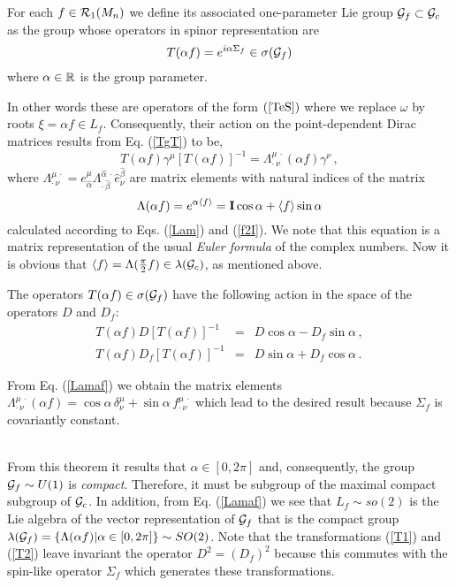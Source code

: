 \documentclass[a4paper,12pt]{article}
\begin{document}
\begin{defin}
For each $f\in {\cal R}_1(M_n)$ we define its associated one-parameter Lie 
group ${\cal G}_{f} \subset {\cal G}_c$ as the group whose operators in 
spinor representation are
\begin{equation}\label{Taf}
T(\alpha f)=e^{i\alpha \Sigma_f} \in \sigma({\cal G}_f)
\end{equation}
where  $\alpha \in{\Bbb R}$ is the group parameter.  
\end{defin}  
In other words these are operators of the form $(\ref{TeS})$ 
where we replace $\omega$ by roots $\xi=\alpha f\in L_f$. Consequently, their 
action 
on the point-dependent Dirac matrices results from  Eq. (\ref{TgT}) to be,    
\begin{equation}\label{TgT1}
T(\alpha f)\gamma^{\mu}[T(\alpha f)]^{-1}=
\Lambda^{\mu\,\cdot}_{\cdot\,\nu}(\alpha f)\gamma^{\nu}\,, 
\end{equation}
where  
$\Lambda^{\mu\,\cdot}_{\cdot\,\nu}= 
e^{\mu}_{\hat\alpha}\Lambda^{\hat\alpha\,\cdot}_{\cdot\,\hat\beta}
\hat e^{\hat\beta}_{\nu}$ are matrix elements with natural indices of the 
matrix 
\begin{equation}\label{Lamaf}
\Lambda(\alpha f)=e^{\alpha \left<f\right>}={\bf I}\cos\alpha+ 
\left<f\right>\sin\alpha  
\end{equation}   
calculated according to Eqs. (\ref{Lam})  and (\ref{f2I}). We note that this 
equation is a matrix representation of the usual {\em Euler formula} of the 
complex numbers. Now it is obvious that $\left<f\right>=\Lambda(\frac{\pi}{2}f)
\in \lambda({\cal G}_c)$, as mentioned above.  
\begin{theor}\label{TDT}
The operators  $T(\alpha f)\in \sigma({\cal G}_f)$ have the following action in the 
space of the operators $D$ and $D_f$:
\begin{eqnarray}
T(\alpha f) D [T(\alpha f)]^{-1}&=&D\cos\alpha-D_f\sin\alpha\,,\label{T1}\\        
T(\alpha f) D_f [T(\alpha f)]^{-1}&=&D\sin\alpha+D_f\cos\alpha\,.        
\label{T2}
\end{eqnarray}
\end{theor}
\begin{demo}
From Eq. (\ref{Lamaf}) we obtain the matrix elements
$\Lambda^{\mu\,\cdot}_{\cdot\,\nu}(\alpha f)=
\cos\alpha\, \delta^{\mu}_{\nu}+\sin\alpha\,  
f^{\mu\,\cdot}_{\cdot\,\nu}$
which lead to the desired result because $\Sigma_f$ is covariantly constant. 
\end{demo}\\
From this theorem it results that $\alpha\in [0,2\pi]$ and, consequently, 
the group ${\cal G}_f\sim U(1)$ is {\em compact}. Therefore, it must be  
subgroup of the maximal compact subgroup of ${\cal G}_c$. In addition, 
from Eq. (\ref{Lamaf}) we see that $L_{f}\sim so(2)$ is the Lie algebra of the 
vector representation of ${\cal G}_f$ that is the compact group 
$\lambda({\cal G}_f)=\{\Lambda(\alpha f)|\alpha\in [0,2\pi]\} \sim SO(2)$. 
Note that the transformations (\ref{T1}) and (\ref{T2})  
leave invariant the operator $D^2=(D_f)^2$  because this commutes 
with the spin-like operator $\Sigma_f$ which generates these transformations.  
\end{document}

